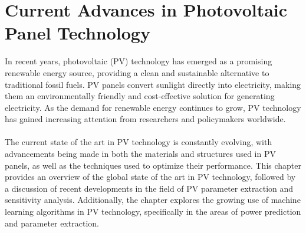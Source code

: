 \documentclass{report}
\begin{document}
\section{Current Advances in Photovoltaic Panel Technology}
In recent years, photovoltaic (PV) technology has emerged as a promising renewable energy source, providing a clean and sustainable alternative to traditional fossil fuels. PV panels convert sunlight directly into electricity, making them an environmentally friendly and cost-effective solution for generating electricity. As the demand for renewable energy continues to grow, PV technology has gained increasing attention from researchers and policymakers worldwide.\\
\\
The current state of the art in PV technology is constantly evolving, with advancements being made in both the materials and structures used in PV panels, as well as the techniques used to optimize their performance. This chapter provides an overview of the global state of the art in PV technology, followed by a discussion of recent developments in the field of PV parameter extraction and sensitivity analysis. Additionally, the chapter explores the growing use of machine learning algorithms in PV technology, specifically in the areas of power prediction and parameter extraction.
\end{document}
